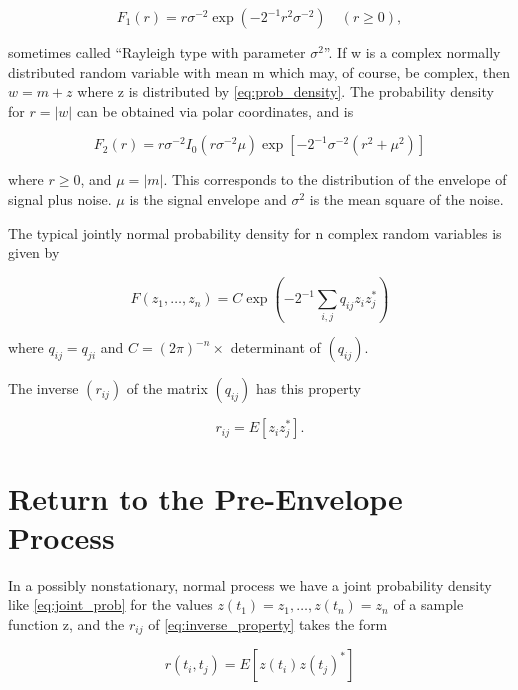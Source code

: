 \documentclass[10pt,twocolumn]{article}
\theoremstyle{definition}
\begin{document}
\begin{equation}
\label{eq:rayleigh}
F_1(r) = r\sigma^{-2} \exp (-2^{-1}r^2\sigma^{-2}) \quad (r \geq 0),
\end{equation}

sometimes called ``Rayleigh type with parameter $\sigma^2$''. If w is a complex normally distributed random variable with mean m which may, of course, be complex, then $w = m + z$ where z is distributed by \eqref{eq:prob_density}. The probability density for $r = |w|$ can be obtained via polar coordinates, and is

\begin{equation}
\label{eq:prob_density_r}
F_2(r) = r\sigma^{-2}I_0(r\sigma^{-2}\mu) \exp [-2^{-1}\sigma^{-2}(r^2 + \mu^2)]
\end{equation}

where $r \geq 0$, and $\mu = |m|$. This corresponds to the distribution of the envelope of signal plus noise. $\mu$ is the signal envelope and $\sigma^2$ is the mean square of the noise.

The typical jointly normal probability density for n complex random variables is given by

\begin{equation}
\label{eq:joint_prob}
F(z_1, \ldots, z_n) = C \exp (-2^{-1} \sum_{i,j} q_{ij} z_i z_j^*)
\end{equation}

where $q_{ij} = q_{ji}$ and $C = (2\pi)^{-n} \times$ determinant of $(q_{ij})$.

The inverse $(r_{ij})$ of the matrix $(q_{ij})$ has this property

\begin{equation}
\label{eq:inverse_property}
r_{ij} = E[z_i z_j^*].
\end{equation}

\section{Return to the Pre-Envelope Process}

In a possibly nonstationary, normal process we have a joint probability density like \eqref{eq:joint_prob} for the values $z(t_1) = z_1, \ldots, z(t_n) = z_n$ of a sample function z, and the $r_{ij}$ of \eqref{eq:inverse_property} takes the form

\begin{equation}
\label{eq:r_ij_form}
r(t_i, t_j) = E[z(t_i)z(t_j)^*]
\end{equation}
\end{document}
